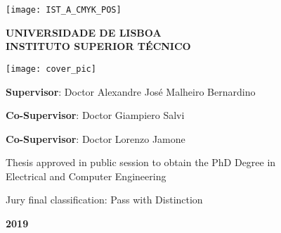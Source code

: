 

\begin{titlepage}
\setlength{\parindent}{0pt}
\texttt{[image: IST\_A\_CMYK\_POS]}

\begingroup
\centering

\vspace{0.75cm}

\Large
\textbf{UNIVERSIDADE DE LISBOA\\
INSTITUTO SUPERIOR TÉCNICO}

\myVertSpace

\texttt{[image: cover\_pic]}

\myVertSpace

\large

\textbf{\myThesisTitle}

\vspace{0.75cm}

\myFullName

\myVertSpace
\endgroup

\large

\textbf{Supervisor}: Doctor Alexandre José Malheiro Bernardino

\textbf{Co-Supervisor}: Doctor Giampiero Salvi

\textbf{Co-Supervisor}: Doctor Lorenzo Jamone

\myVertSpace

\centering

Thesis approved in public session to obtain the PhD Degree in\\Electrical and Computer Engineering

\vspace{0.75cm}

Jury final classification: Pass with Distinction

\vspace{\fill}

\textbf{2019}
\end{titlepage}

\restoregeometry
